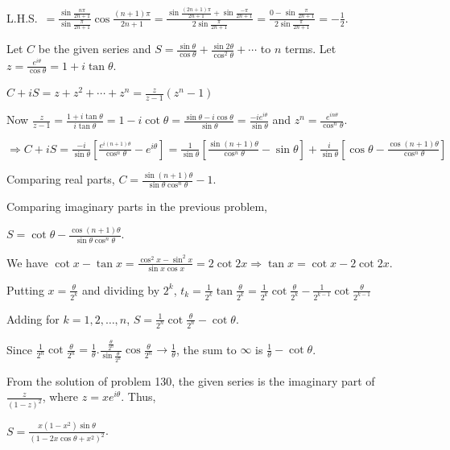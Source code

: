   L.H.S.\ $= \frac{\sin\frac{n\pi}{2n + 1}}{\sin\frac{\pi}{2n + 1}}\cos\frac{(n + 1)\pi}{2n + 1} =
  \frac{\sin\frac{(2n + 1)\pi}{2n + 1} + \sin\frac{-\pi}{2n + 1}}{2\sin\frac{\pi}{2n + 1}} = \frac{0 -
    \sin\frac{\pi}{2n + 1}}{2\sin\frac{\pi}{2n + 1}} = -\frac{1}{2}$.
\item Let $C$ be the given series and $S = \frac{\sin\theta}{\cos\theta} + \frac{\sin2\theta}{\cos^2\theta} +
  \cdots$ to $n$ terms. Let $z = \frac{e^{i\theta}}{\cos\theta} = 1 + i\tan\theta$.

  $C + iS = z + z^2 + \cdots + z^n = \frac{z}{z - 1}\left(z^n - 1\right)$

  Now $\frac{z}{z - 1} = \frac{1 + i\tan\theta}{i\tan\theta} = 1 - i\cot\theta = \frac{\sin\theta -
    i\cos\theta}{\sin\theta} = \frac{-ie^{i\theta}}{\sin\theta}$ and $z^n = \frac{e^{in\theta}}{\cos^n\theta}$.

  $\Rightarrow C + iS = \frac{-i}{\sin\theta}\left[\frac{e^{i(n + 1)\theta}}{\cos^n\theta} - e^{i\theta}\right]
  = \frac{1}{\sin\theta}\left[\frac{\sin(n + 1)\theta}{\cos^n\theta} - \sin\theta\right] +
  \frac{i}{\sin\theta}\left[\cos\theta - \frac{\cos(n + 1)\theta}{\cos^n\theta}\right]$

  Comparing real parts, $C = \frac{\sin(n + 1)\theta}{\sin\theta\cos^n\theta} - 1$.
\item Comparing imaginary parts in the previous problem,

  $S = \cot\theta - \frac{\cos(n + 1)\theta}{\sin\theta\cos^n\theta}$.
\item We have $\cot x - \tan x = \frac{\cos^2x - \sin^2x}{\sin x\cos x} = 2\cot2x \Rightarrow \tan x = \cot x
  - 2\cot2x$.

  Putting $x = \frac{\theta}{2^k}$ and dividing by $2^k$, $t_k = \frac{1}{2^k}\tan\frac{\theta}{2^k} =
  \frac{1}{2^k}\cot\frac{\theta}{2^k} - \frac{1}{2^{k - 1}}\cot\frac{\theta}{2^{k - 1}}$

  Adding for $k = 1, 2, \ldots, n$, $S = \frac{1}{2^n}\cot\frac{\theta}{2^n} - \cot\theta$.

  Since $\frac{1}{2^n}\cot\frac{\theta}{2^n} = \frac{1}{\theta}.\frac{\frac{\theta}{2^n}}{\sin\frac{\theta}{2^n}}
  \cos\frac{\theta}{2^n} \to \frac{1}{\theta}$, the sum to $\infty$ is $\frac{1}{\theta} - \cot\theta$.
\item From the solution of problem 130, the given series is the imaginary part of $\frac{z}{(1 - z)^2}$, where
  $z = xe^{i\theta}$. Thus,

  $S = \frac{x\left(1 - x^2\right)\sin\theta}{\left(1 - 2x\cos\theta + x^2\right)^2}$.
\stopitemize
